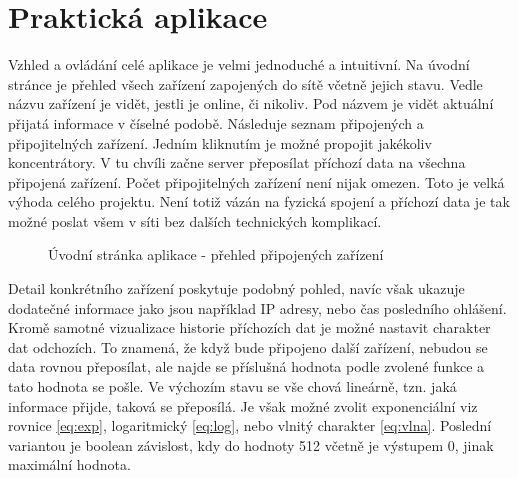 \chapter{Praktická aplikace}
Vzhled a ovládání celé aplikace je velmi jednoduché a intuitivní. Na úvodní stránce je přehled všech zařízení zapojených do sítě včetně jejich stavu. Vedle názvu zařízení je vidět, jestli je online, či nikoliv. Pod názvem je vidět aktuální přijatá informace v číselné podobě. Následuje seznam připojených a připojitelných zařízení. Jedním kliknutím je možné propojit jakékoliv koncentrátory. V tu chvíli začne server přeposílat příchozí data na všechna připojená zařízení. Počet připojitelných zařízení není nijak omezen. Toto je velká výhoda celého projektu. Není totiž vázán na fyzická spojení a příchozí data je tak možné poslat všem v síti bez dalších technických komplikací.

\begin{figure}[h]
    \centering
	\caption{Úvodní stránka aplikace - přehled připojených zařízení}
	\label{fig:speedy1}
\end{figure}

Detail konkrétního zařízení poskytuje podobný pohled, navíc však ukazuje dodatečné informace jako jsou například IP adresy, nebo čas posledního ohlášení. Kromě samotné vizualizace historie příchozích dat je možné nastavit charakter dat odchozích. To znamená, že když bude připojeno další zařízení, nebudou se data rovnou přeposílat, ale najde se příslušná hodnota podle zvolené funkce a tato hodnota se pošle. Ve výchozím stavu se vše chová lineárně, tzn. jaká informace přijde, taková se přeposílá. Je však možné zvolit exponenciální viz rovnice \ref{eq:exp}, logaritmický \ref{eq:log}, nebo vlnitý charakter \ref{eq:vlna}. Poslední variantou je boolean závislost, kdy do hodnoty 512 včetně je výstupem 0, jinak maximální hodnota.

